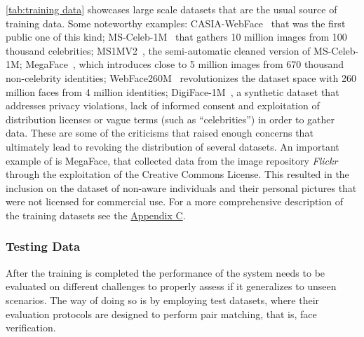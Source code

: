 \documentclass[class=report, crop=false, a4paper, 12pt]{standalone}
\begin{document}
\par \autoref{tab:training data} showcases large scale datasets that are the usual source of training data. Some noteworthy examples: CASIA-WebFace~\autocite{yiLearningFaceRepresentation2014} that was the first public one of this kind; MS-Celeb-1M~\autocite{guoMSCeleb1MDatasetBenchmark2016} that gathers 10 million images from 100 thousand celebrities; MS1MV2~\autocite{dengArcFaceAdditiveAngular}, the semi-automatic cleaned version of MS-Celeb-1M; MegaFace~\autocite{nechLevelPlayingField2017}, which introduces close to 5 million images from 670 thousand non-celebrity identities; WebFace260M~\autocite{zhuWebFace260MBenchmarkUnveiling2021} revolutionizes the dataset space with 260 million faces from 4 million identities; DigiFace-1M~\autocite{baeDigiFace1MMillionDigital2023}, a synthetic dataset that addresses privacy violations, lack of informed consent and exploitation of distribution licenses or vague terms (such as ``celebrities'') in order to gather data. These are some of the criticisms that raised enough concerns that ultimately lead to revoking the distribution of several datasets. An important example of is MegaFace, that collected data from the image repository \textit{Flickr} through the exploitation of the Creative Commons License. This resulted in the inclusion on the dataset of non-aware individuals and their personal pictures that were not licensed for commercial use. For a more comprehensive description of the training datasets see the \hyperref[appendix:train_data_appendix]{Appendix C}.

\subsubsection{\large Testing Data}

\par After the training is completed the performance of the system needs to be evaluated on different challenges to properly assess if it generalizes to unseen scenarios. The way of doing so is by employing test datasets, where their evaluation protocols are designed to perform pair matching, that is, face verification. 
\end{document}
